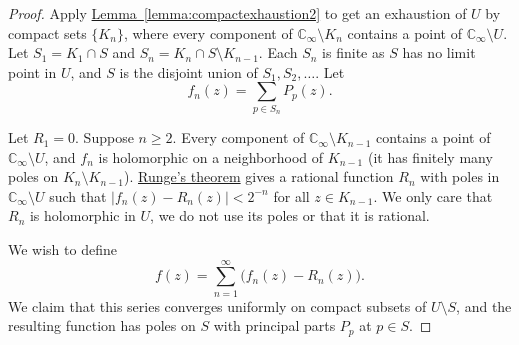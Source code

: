 \documentclass[12pt,openany]{book}
\newcommand{\sabs}[1]{\lvert {#1} \rvert}
\newcommand{\C}{{\mathbb{C}}}
\theoremstyle{plain}
\theoremstyle{remark}
\theoremstyle{definition}
\theoremstyle{exercise}
\theoremstyle{example}
\newcommand{\lemmaref}[1]{\hyperref[#1]{Lemma~\ref*{#1}}}
\begin{document}
\begin{proof}
Apply \lemmaref{lemma:compactexhaustion2} to get an exhaustion
of $U$ by compact sets $\{ K_n \}$,
where every component of $\C_\infty \setminus K_{n}$
contains a point of $\C_\infty \setminus U$.
Let $S_1 = K_1 \cap S$ and
$S_n = K_n \cap S \setminus K_{n-1}$.
Each $S_n$ is finite as $S$ has no limit point in $U$,
and $S$ is the disjoint union of $S_1,S_2,\ldots$.
Let
\begin{equation*}
f_n(z) = \sum_{p \in S_n} P_p(z) .
\end{equation*}

Let $R_1=0$.  Suppose $n \geq 2$.
Every component of $\C_\infty \setminus K_{n-1}$ contains a point of
$\C_\infty \setminus U$, and $f_n$ is holomorphic on a neighborhood of
$K_{n-1}$ (it has finitely many poles on $K_n \setminus K_{n-1}$).
\hyperref[cor:rungeseq]{Runge's theorem}
gives a rational function $R_n$ with poles in 
$\C_\infty \setminus U$ such that $\sabs{f_n(z)-R_n(z)} < 2^{-n}$
for all $z \in K_{n-1}$.  We only care that $R_n$ is holomorphic in $U$, we
do not use its poles or that it is rational.

We wish to define
\begin{equation*}
f(z) = \sum_{n=1}^\infty \bigl( f_n(z) - R_n(z) \bigr) .
\end{equation*}
We claim that this series converges uniformly on compact subsets of $U \setminus S$,
and the resulting function has poles on $S$
with principal parts $P_p$ at $p \in S$.


\end{proof}
\end{document}
